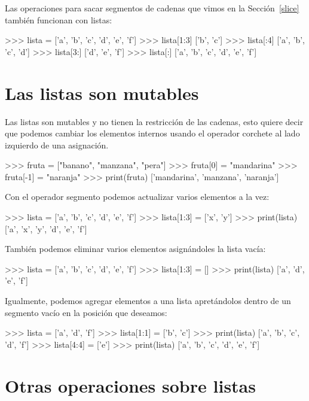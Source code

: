  

Las operaciones para sacar segmentos de cadenas que vimos en la Sección~\ref{slice}
también funcionan con listas:
\begin{pyconcode}
>>> lista = ['a', 'b', 'c', 'd', 'e', 'f']
>>> lista[1:3]
['b', 'c']
>>> lista[:4]
['a', 'b', 'c', 'd']
>>> lista[3:]
['d', 'e', 'f']
>>> lista[:]
['a', 'b', 'c', 'd', 'e', 'f']
\end{pyconcode}

\section{Las listas son mutables}

 

Las listas son mutables y no tienen la restricción de las cadenas,
esto quiere decir que podemos cambiar los elementos internos usando
el operador corchete al lado izquierdo de una asignación.
\begin{pyconcode}
>>> fruta = ["banano", "manzana", "pera"]
>>> fruta[0] = "mandarina"
>>> fruta[-1] = "naranja"
>>> print(fruta)
['mandarina', 'manzana', 'naranja']
\end{pyconcode}
 Con el operador segmento podemos actualizar varios elementos a la
vez:
\begin{pyconcode}
>>> lista = ['a', 'b', 'c', 'd', 'e', 'f']
>>> lista[1:3] = ['x', 'y']
>>> print(lista)
['a', 'x', 'y', 'd', 'e', 'f']
\end{pyconcode}

También podemos eliminar varios elementos asignándoles la lista vacía:
\begin{pyconcode}
>>> lista = ['a', 'b', 'c', 'd', 'e', 'f']
>>> lista[1:3] = []
>>> print(lista)
['a', 'd', 'e', 'f']
\end{pyconcode}

Igualmente, podemos agregar elementos a una lista apretándolos dentro
de un segmento vacío en la posición que deseamos:
\begin{pyconcode}
>>> lista = ['a', 'd', 'f']
>>> lista[1:1] = ['b', 'c']
>>> print(lista)
['a', 'b', 'c', 'd', 'f']
>>> lista[4:4] = ['e']
>>> print(lista)
['a', 'b', 'c', 'd', 'e', 'f']
\end{pyconcode}

\section{Otras operaciones sobre listas}

